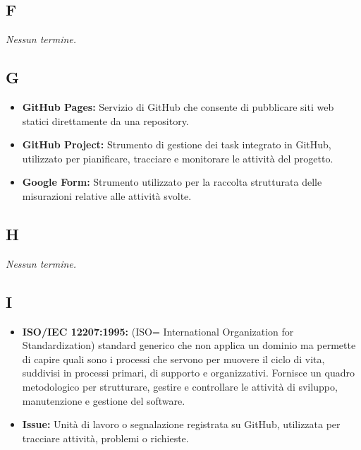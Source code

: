 {}
\subsection*{F}
\textit{Nessun termine.}

{}
\subsection*{G}
\begin{itemize}[leftmargin=*]
    \item \textbf{GitHub Pages:} Servizio di GitHub che consente di pubblicare siti web statici direttamente da una repository.
    \item \textbf{GitHub Project:} Strumento di gestione dei task integrato in GitHub, utilizzato per pianificare, tracciare e monitorare le attività del progetto.
    \item \textbf{Google Form:} Strumento utilizzato per la raccolta strutturata delle misurazioni relative alle attività svolte.
\end{itemize}

{}
\subsection*{H}
\textit{Nessun termine.}

{}
\subsection*{I}
\begin{itemize}[leftmargin=*]
    \item \textbf{ISO/IEC 12207:1995:} (ISO= International Organization for Standardization) standard generico che non applica un dominio ma permette di capire quali sono i processi che servono per muovere il ciclo di vita, suddivisi in processi primari, di supporto e organizzativi. Fornisce un quadro metodologico per strutturare, gestire e controllare le attività di sviluppo, manutenzione e gestione del software.
    \item \textbf{Issue:} Unità di lavoro o segnalazione registrata su GitHub, utilizzata per tracciare attività, problemi o richieste.
\end{itemize}

